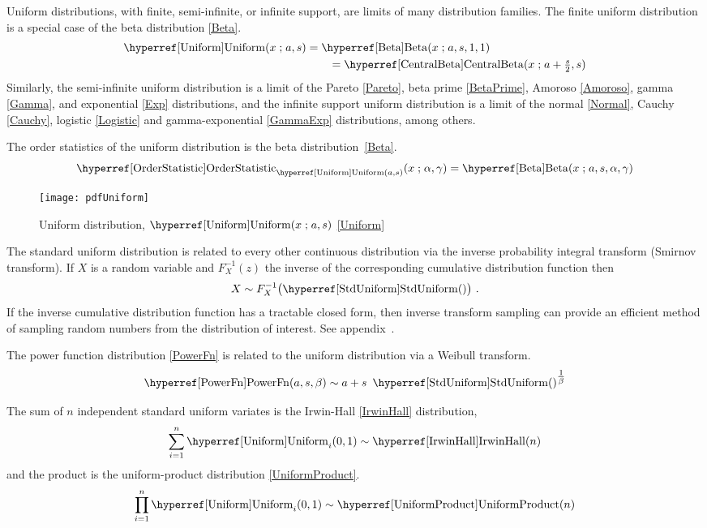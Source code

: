 Uniform distributions, with finite, semi-infinite, or infinite support, are limits of many distribution families. The finite uniform distribution is a special case of the beta distribution \eqref{Beta}.
\begin{align*}
 \opr{Uniform}(x\given a,s)  &=  \opr{Beta}(x\given a, s, 1,1) 	\checked
 \\
 &\qquad=  \opr{CentralBeta}(x\given a+\tfrac{s}{2}, s) \checked
\end{align*}
Similarly, the semi-infinite uniform distribution is a limit of the Pareto \eqref{Pareto}, beta prime \eqref{BetaPrime}, Amoroso \eqref{Amoroso}, gamma \eqref{Gamma}, and exponential  \eqref{Exp} distributions, and the infinite support uniform distribution is a limit of the normal \eqref{Normal}, Cauchy \eqref{Cauchy}, logistic \eqref{Logistic} and  gamma-exponential  \eqref{GammaExp} distributions, among others. 

The order statistics  of the uniform distribution is the beta distribution~\eqref{Beta}.
\[
\opr{OrderStatistic}_{\opr{Uniform}(a,s)}(x \given \alpha, \gamma) =  \opr{Beta}(x\given a, s, \alpha, \gamma) 
\checked
\notag
\]


\begin{figure}[t]
\begin{center}
\texttt{[image: pdfUniform]}
\end{center}
\caption[Uniform distribution]{Uniform distribution, $\opr{Uniform}(x\given a,s)$ \eqref{Uniform}}
\end{figure}


The standard uniform distribution is related to every other continuous distribution via the  inverse probability integral transform (Smirnov transform). If $X$ is a random variable and $F_X^{-1}(z)$ the inverse of the corresponding cumulative distribution function then 
\[ 
X \sim F_X^{-1}\bigl( \opr{StdUniform}() \bigr) \ .  \checked
\notag
\]
If the inverse cumulative distribution function has a tractable closed form, then inverse transform sampling can provide an efficient method of sampling random numbers from the distribution of interest. See appendix~.

The power function distribution \eqref{PowerFn} is related to the uniform distribution via a Weibull transform.
\[
\opr{PowerFn}(a,s,\beta) \sim a + s\ \opr{StdUniform}()^{\tfrac{1}{\beta}}  \checked
\notag
\]

The sum of $n$ independent standard uniform variates is the  Irwin-Hall \eqref{IrwinHall} distribution,
\[
\sum_{i=1}^{n} \opr{Uniform}_i(0,1)  \sim \opr{IrwinHall}(n) \checked
\notag
\]
and the product is the uniform-product distribution \eqref{UniformProduct}.
\[
\prod_{i=1}^{n} \opr{Uniform}_i(0,1)  \sim \opr{UniformProduct}(n) \checked
\notag
\]




